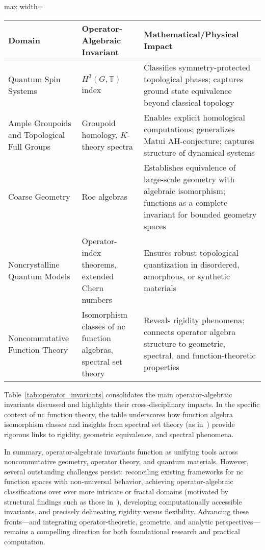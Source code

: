 \documentclass[sigconf]{acmart}
\begin{document}
\begin{table*}[htbp]
\centering
\caption{Summary of Key Operator-Algebraic Invariants across Topics}
\label{tab:operator_invariants}
\begin{adjustbox}{max width=\textwidth}
\begin{tabular}{lll}
\toprule
\textbf{Domain} & \textbf{Operator-Algebraic Invariant} & \textbf{Mathematical/Physical Impact} \\
\midrule
Quantum Spin Systems     & $H^3(G, \mathbb{T})$ index & Classifies symmetry-protected topological phases; captures ground state equivalence beyond classical topology \\
Ample Groupoids and Topological Full Groups & Groupoid homology, $K$-theory spectra & Enables explicit homological computations; generalizes Matui AH-conjecture; captures structure of dynamical systems \\
Coarse Geometry         & Roe algebras              & Establishes equivalence of large-scale geometry with algebraic isomorphism; functions as a complete invariant for bounded geometry spaces \\
Noncrystalline Quantum Models & Operator-index theorems, extended Chern numbers & Ensures robust topological quantization in disordered, amorphous, or synthetic materials \\
Noncommutative Function Theory & Isomorphism classes of nc function algebras, spectral set theory & Reveals rigidity phenomena; connects operator algebra structure to geometric, spectral, and function-theoretic properties \\
\bottomrule
\end{tabular}
\end{adjustbox}
\end{table*}

Table~\ref{tab:operator_invariants} consolidates the main operator-algebraic invariants discussed and highlights their cross-disciplinary impacts. In the specific context of nc function theory, the table underscores how function algebra isomorphism classes and insights from spectral set theory (as in~\cite{ref99}) provide rigorous links to rigidity, geometric equivalence, and spectral phenomena.

In summary, operator-algebraic invariants function as unifying tools across noncommutative geometry, operator theory, and quantum materials. However, several outstanding challenges persist: reconciling existing frameworks for nc function spaces with non-universal behavior, achieving operator-algebraic classifications over ever more intricate or fractal domains (motivated by structural findings such as those in~\cite{ref14}), developing computationally accessible invariants, and precisely delineating rigidity versus flexibility. Advancing these fronts---and integrating operator-theoretic, geometric, and analytic perspectives---remains a compelling direction for both foundational research and practical computation.
\end{document}
